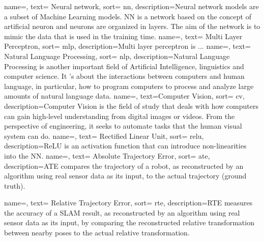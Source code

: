 {
    name=,
    text= Neural network,
    sort= nn,
    description={Neural network models are a subset of Machine Learning models. NN is a network based on the concept of artificial neuron and neurons are organized in layers. The aim of the network is to mimic the data that is used in the training time. }
}
{
    name=,
    text= Multi Layer Perceptron,
    sort= mlp,
    description={Multi layer perceptron is ...}
}
{
    name=,
    text= Natural Language Processing,
    sort= nlp,
    description={Natural Language Processing is another important field of Artificial Intelligence, linguistics and computer science. It 's about the interactions between computers and human language, in particular, how to program computers to process and analyze large amounts of natural language data.}
}
{
    name=,
    text=Computer Vision,
    sort= cv,
    description={Computer Vision is the field of study that deals with how computers can gain high-level understanding from digital images or videos. From the perspective of engineering, it seeks to automate tasks that the human visual system can do.}
}
{
    name=,
    text= Rectified Linear Unit,
    sort= relu,
    description={ReLU is an activation function that can introduce non-linearities into the NN.}
}
{
    name=,
    text= Absolute Trajectory Error,
    sort= ate,
    description={ATE compares the trajectory of a robot, as reconstructed by an algorithm using real sensor data as its input, to the actual trajectory (ground truth).}
}

{
    name=,
    text= Relative Trajectory Error,
    sort= rte,
    description={RTE measures the accuracy of a SLAM result, as reconstructed by an algorithm using real sensor data as its input, by comparing the reconstructed relative transformation between nearby poses to the actual relative transformation.}
}

